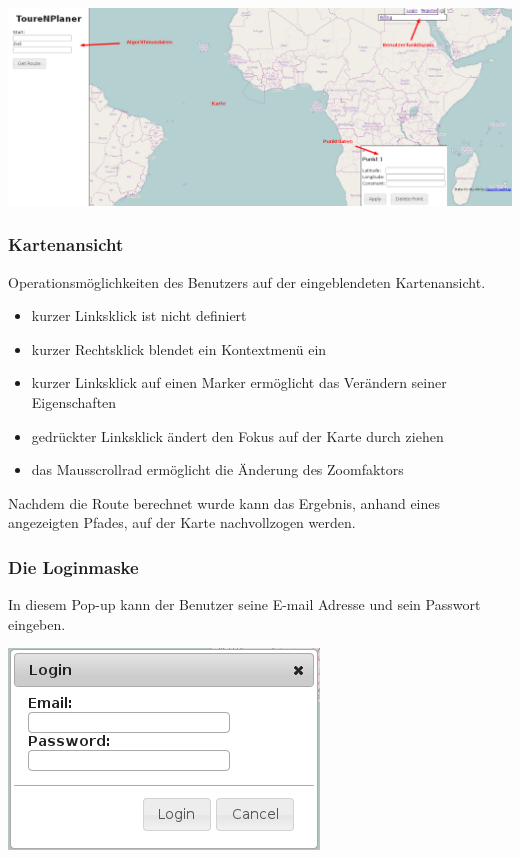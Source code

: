\documentclass[a4paper,10pt,titlepage]{article}
\begin{document}
\includegraphics[scale=0.30]{media/web/Index.png} 

\subsubsection{Kartenansicht}
Operationsmöglichkeiten des Benutzers auf der eingeblendeten Kartenansicht.
\begin {itemize}
\item kurzer Linksklick ist nicht definiert
\item kurzer Rechtsklick blendet ein Kontextmenü ein
\item kurzer Linksklick auf einen Marker ermöglicht das Verändern seiner Eigenschaften
\item gedrückter Linksklick ändert den Fokus auf der Karte durch ziehen
\item das Mausscrollrad ermöglicht die Änderung des Zoomfaktors
\end {itemize}
Nachdem die Route berechnet wurde kann das Ergebnis, anhand eines angezeigten Pfades, auf der Karte nachvollzogen werden.

\subsubsection{Die Loginmaske}
In diesem Pop-up kann der Benutzer seine E-mail Adresse und sein Passwort eingeben.
\begin {center}
\includegraphics[scale=0.5]{media/web/Login.png}
\end {center}
\end{document}
